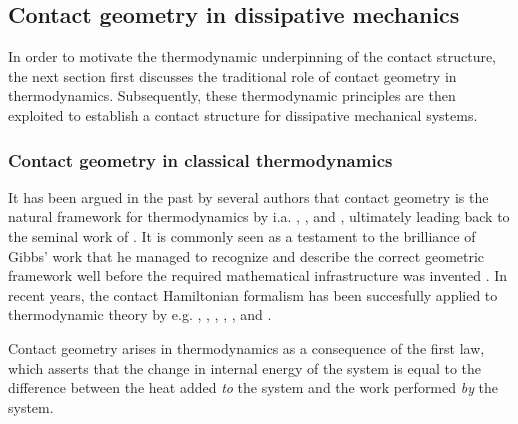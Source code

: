 \subsection{Contact geometry in dissipative mechanics}
\label{ssec:contact_dissipation}
In order to motivate the thermodynamic underpinning of the contact structure, the next section first discusses the traditional role of contact geometry in thermodynamics. Subsequently, these thermodynamic principles are then exploited to establish a contact structure for dissipative mechanical systems.

\subsubsection{Contact geometry in classical thermodynamics}
It has been argued in the past by several authors that contact geometry is the natural framework for thermodynamics by i.a. \citet{Arnold1991,Arnold1989a,Arnold1989,Arnold1989b}, \citet{Bamberg1988}, \citet{Burke1985} and \citet{Hermann1973}, ultimately leading back to the seminal work of \citet{Gibbs1873}. It is commonly seen as a testament to the brilliance of Gibbs' work that he managed to recognize and describe the correct geometric framework well before the required mathematical infrastructure was invented \cite{Wightman1979}. In recent years, the contact Hamiltonian formalism has been succesfully applied to thermodynamic theory by e.g. \citet{Mrugala1991,Mrugala2000,Mrugala1984,Mrugala1985,Mrugala1993,Mrugala1996}, \citet{Balian2001}, \citet{VanderSchaft2021a,VanderSchaft2018}, \citet{Maschke2018}, \citet{Bravetti2015}, and \citet{Simoes2020}. 

Contact geometry arises in thermodynamics as a consequence of the first law, which asserts that the change in internal energy of the system is equal to the difference between the heat added \emph{to} the system and the work performed \emph{by} the system. 

